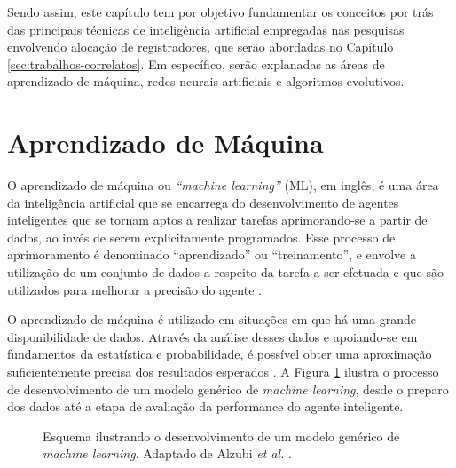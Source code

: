 \documentclass[
	12pt,				%
	openright,			%
	twoside,			%
	a4paper,			%
	tcc,			%
	]{ABNT-DC-UEL}
\begin{document}
Sendo assim, este capítulo tem por objetivo fundamentar os conceitos por trás das principais técnicas de inteligência artificial empregadas nas pesquisas envolvendo alocação de registradores, que serão abordadas no Capítulo \ref{sec:trabalhos-correlatos}. Em específico, serão explanadas as áreas de aprendizado de máquina, redes neurais artificiais e algoritmos evolutivos.

\section{Aprendizado de Máquina}

O aprendizado de máquina ou \textit{``machine learning''} (ML), em inglês, é uma área da inteligência artificial que se encarrega do desenvolvimento de agentes inteligentes que se tornam aptos a realizar tarefas aprimorando-se a partir de dados, ao invés de serem explicitamente programados. Esse processo de aprimoramento é denominado ``aprendizado'' ou ``treinamento'', e envolve a utilização de um conjunto de dados a respeito da tarefa a ser efetuada e que são utilizados para melhorar a precisão do agente \cite{alzubi:18}.

O aprendizado de máquina é utilizado em situações em que há uma grande disponibilidade de dados. Através da análise desses dados e apoiando-se em fundamentos da estatística e probabilidade, é possível obter uma aproximação suficientemente precisa dos resultados esperados \cite{alpaydin:20}. A Figura \ref{fig:ml-esquema} ilustra o processo de desenvolvimento de um modelo genérico de \textit{machine learning}, desde o preparo dos dados até a etapa de avaliação da performance do agente inteligente.

\begin{figure}[htb]
    \centering
    \caption{Esquema ilustrando o desenvolvimento de um modelo genérico de \textit{machine learning}. Adaptado de Alzubi \textit{et al.} \cite{alzubi:18}.}
    \label{fig:ml-esquema}
\end{figure}
\end{document}
